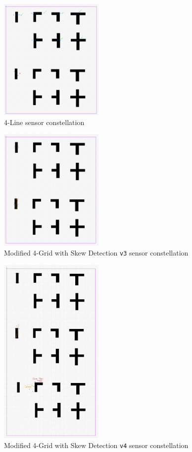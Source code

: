 \documentclass[conference]{IEEEtran}
\begin{document}
\begin{figure}[htbp]
	\centerline{\includegraphics[width=0.45\textwidth]{constellation-4-line.png}}
	\caption{4-Line sensor constellation}
	\label{fig:constellation-4-line}
\end{figure}
\begin{figure}[htbp]
	\centerline{\includegraphics[width=0.45\textwidth]{constellation-4-skew-v3.png}}
	\caption{Modified 4-Grid with Skew Detection \texttt{v3} sensor constellation}
	\label{fig:constellation-4-skew-v3}
\end{figure}
\begin{figure}[htbp]
	\centerline{\includegraphics[width=0.45\textwidth]{constellation-4-skew-v4.png}}
	\caption{Modified 4-Grid with Skew Detection \texttt{v4} sensor constellation}
	\label{fig:constellation-4-skew-v4}
\end{figure}
\end{document}
